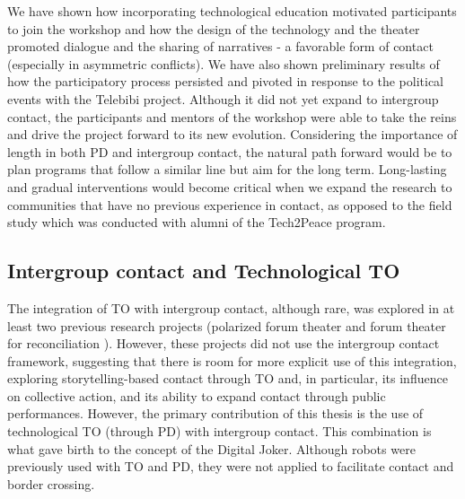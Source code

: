 \documentclass[dissertation,math,vertlayout,pdfa,colorlinks,nologo]{aaltoseries}
\begin{document}
We have shown how incorporating technological education motivated participants to join the workshop and how the design of the technology and the theater promoted dialogue and the sharing of narratives - a favorable form of contact (especially in asymmetric conflicts). We have also shown preliminary results of how the participatory process persisted and pivoted in response to the political events with the Telebibi project. Although it did not yet expand to intergroup contact, the participants and mentors of the workshop were able to take the reins and drive the project forward to its new evolution. Considering the importance of length in both PD and intergroup contact, the natural path forward would be to plan programs that follow a similar line but aim for the long term. Long-lasting and gradual interventions would become critical when we expand the research to communities that have no previous experience in contact, as opposed to the field study which was conducted with alumni of the Tech2Peace program.

\subsection{Intergroup contact and Technological TO}
The integration of TO with intergroup contact, although rare, was explored in at least two previous research projects (polarized forum theater \cite{alonCHAPTERFOURTEENNonViolent2011} and forum theater for reconciliation \cite{miramontiForumTheatreReconciliation2025}). However, these projects did not use the intergroup contact framework, suggesting that there is room for more explicit use of this integration, exploring storytelling-based contact through TO and, in particular, its influence on collective action, and its ability to expand contact through public performances. However, the primary contribution of this thesis is the use of technological TO (through PD) with intergroup contact. This combination is what gave birth to the concept of the Digital Joker. Although robots were previously used with TO and PD, they were not applied to facilitate contact and border crossing.
\end{document}
